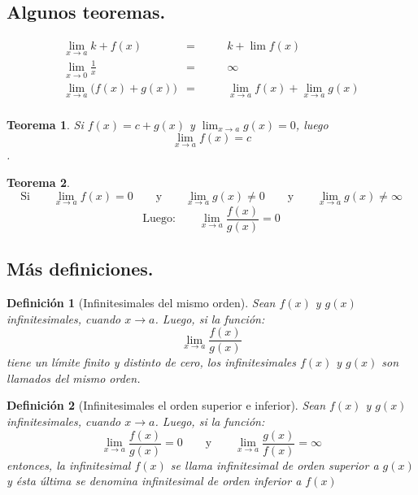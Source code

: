 \message{ !name(analisis-mat.tex)}\documentclass[12pt,a4paper]{article}
\newtheorem{mydef}{Definici\'on}[section]
\newtheorem{theorem}{Teorema}[section]
\begin{document}
\subsection{Algunos teoremas.}
\begin{align*}
& \lim_{x \to a} k + f(x) & =  \qquad & k + \lim f(x)& \\
& \lim_{x \to 0} \frac{1}{x} & =   \qquad  & \infty & \\
& \lim_{x \to a}\Big(f(x) + g(x)\Big) & =   \qquad  &   \lim_{x \to a} f(x) + \lim_{x  \to a} g(x)&  \\
\end{align*}




\begin{theorem}

Si \( f(x) = c+g(x) \)  y  \(  \lim_{x \to  a}g(x)=0  \), luego \[ \lim_{x \to a} f(x) = c \].

\end{theorem}


\begin{theorem}
\[\text{Si}\qquad\lim_{x \to a}f(x)=0\qquad\text{y}\qquad \lim_{x \to a}g(x)\neq0\qquad\text{y}\qquad\lim_{x \to a}g(x)\neq\infty\]
\[\text{Luego:}\qquad\lim_{x \to a}\frac{f(x)}{g(x)}=0\]
\end{theorem}

\vspace{.5cm}

\subsection{M\'as definiciones.}
\begin{mydef}[Infinitesimales del mismo orden]
Sean $f(x)$ y $g(x)$ infinitesimales, cuando $x \to a$. Luego, si la
funci\'on:
\[\lim_{x \to a}\frac{f(x)}{g(x)}\]
tiene un l\'imite finito y distinto de cero, los infinitesimales
$f(x)$ y $g(x)$ son llamados \emph{del mismo orden}.
\end{mydef}
\begin{mydef}[Infinitesimales el orden superior e inferior]
Sean $f(x)$ y $g(x)$ infinitesimales, cuando $x \to a$. Luego, si la
funci\'on:
\[\lim_{x \to a}\frac{f(x)}{g(x)}=0\qquad\text{y}\qquad\lim_{x \to a}\frac{g(x)}{f(x)}=\infty\]
entonces, la infinitesimal $f(x)$ se llama \emph{infinitesimal de
  orden superior a} $g(x)$ y \'esta \'ultima se denomina
\emph{infinitesimal de orden inferior a} $f(x)$
\end{mydef}
\end{document}
